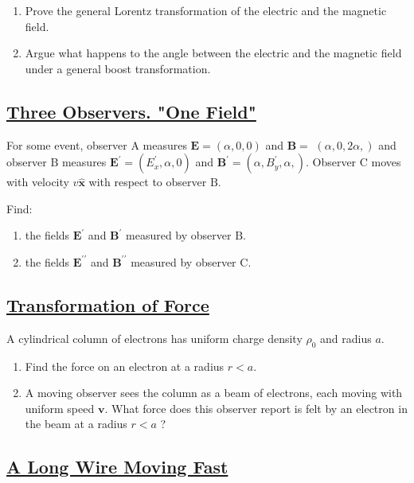\begin{enumerate}
	\item Prove the general Lorentz transformation of the electric and the magnetic field.
	\item Argue what happens to the angle between the electric and the magnetic field under a general boost transformation.
\end{enumerate}

\subsection{\hyperref[Three Observers. "One Field"]{Three Observers. "One Field"}}

For some event, observer A measures $\mathbf{E}=(\alpha, 0,0)$ and $\mathbf{B}=$ $(\alpha, 0,2 \alpha,)$ and observer $\mathrm{B}$ measures $\mathbf{E}^{\prime}=\left(E_{x}^{\prime}, \alpha, 0\right)$ and $\mathbf{B}^{\prime}=\left(\alpha, B_{y}^{\prime}, \alpha,\right) .$ Observer $\mathrm{C}$ moves with velocity $v \hat{\mathbf{x}}$ with respect to observer $\mathrm{B}$.

Find:

\begin{enumerate}
	\item the fields $\mathbf{E}^{\prime}$ and $\mathbf{B}^{\prime}$ measured by observer $\mathrm{B}$.
	\item the fields $\mathbf{E}^{\prime \prime}$ and $\mathbf{B}^{\prime \prime}$ measured by observer $\mathrm{C}$.
\end{enumerate} 

\subsection{\hyperref[Transformation of Force]{Transformation of Force}}

A cylindrical column of electrons has uniform charge density $\rho_{0}$ and radius $a$.

\begin{enumerate}
	\item Find the force on an electron at a radius $r<a$.
	\item A moving observer sees the column as a beam of electrons, each moving with uniform speed $\mathbf{v}$. What force does this observer report is felt by an electron in the beam at a radius $r<a$ ?
\end{enumerate}

\subsection{\hyperref[A Long Wire Moving Fast]{A Long Wire Moving Fast}}


